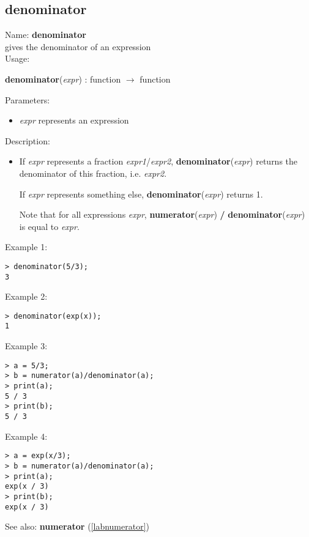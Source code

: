 \subsection{denominator}
\label{labdenominator}
\noindent Name: \textbf{denominator}\\
gives the denominator of an expression\\
\noindent Usage: 
\begin{center}
\textbf{denominator}(\emph{expr}) : \textsf{function} $\rightarrow$ \textsf{function}
\\ 
\end{center}
Parameters: 
\begin{itemize}
\item \emph{expr} represents an expression
\end{itemize}
\noindent Description: \begin{itemize}

\item If \emph{expr} represents a fraction \emph{expr1}/\emph{expr2}, \textbf{denominator}(\emph{expr})
   returns the denominator of this fraction, i.e. \emph{expr2}.
    
   If \emph{expr} represents something else, \textbf{denominator}(\emph{expr}) 
   returns 1.
    
   Note that for all expressions \emph{expr}, \textbf{numerator}(\emph{expr}) \textbf{/} \textbf{denominator}(\emph{expr})
   is equal to \emph{expr}.
\end{itemize}
\noindent Example 1: 
\begin{center}\begin{minipage}{15cm}\begin{Verbatim}[frame=single]
> denominator(5/3);
3
\end{Verbatim}
\end{minipage}\end{center}
\noindent Example 2: 
\begin{center}\begin{minipage}{15cm}\begin{Verbatim}[frame=single]
> denominator(exp(x));
1
\end{Verbatim}
\end{minipage}\end{center}
\noindent Example 3: 
\begin{center}\begin{minipage}{15cm}\begin{Verbatim}[frame=single]
> a = 5/3;
> b = numerator(a)/denominator(a);
> print(a);
5 / 3
> print(b);
5 / 3
\end{Verbatim}
\end{minipage}\end{center}
\noindent Example 4: 
\begin{center}\begin{minipage}{15cm}\begin{Verbatim}[frame=single]
> a = exp(x/3);
> b = numerator(a)/denominator(a);
> print(a);
exp(x / 3)
> print(b);
exp(x / 3)
\end{Verbatim}
\end{minipage}\end{center}
See also: \textbf{numerator} (\ref{labnumerator})
